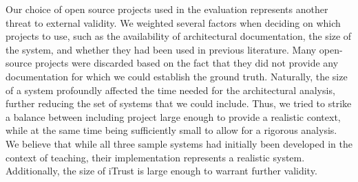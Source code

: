 Our choice of open source projects used in the evaluation represents another threat to external validity. We weighted several factors when deciding on which projects to use, such as the availability of architectural documentation, the size of the system, and whether they had been used in previous literature. Many open-source projects were discarded based on the fact that they did not provide any documentation for which we could establish the ground truth. Naturally, the size of a system profoundly affected the time needed for the architectural analysis, further reducing the set of systems that we could include. Thus, we tried to strike a balance between including project large enough to provide a realistic context, while at the same time being sufficiently small to allow for a rigorous analysis. We believe that while all three sample systems had initially been developed in the context of teaching, their implementation represents a realistic system. Additionally, the size of iTrust is large enough to warrant further validity.


